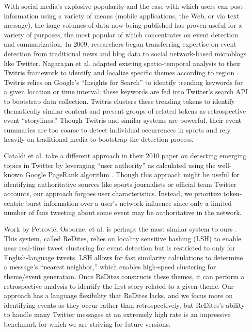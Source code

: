 \documentclass{acm_proc_article-sp}
\begin{document}
{\color{red}
With social media's explosive popularity and the ease with which users can post information using a variety of means (mobile applications, the Web, or via text message), the huge volumes of data now being published has proven useful for a variety of purposes, the most popular of which concentrates on event detection and summarization.
In 2009, researchers began transferring expertise on event detection from traditional news and blog data to social network-based microblogs like Twitter.
Nagarajan et al. adapted existing spatio-temporal analysis to their Twitris framework to identify and localize specific themes according to region \cite{Nagarajan:2009:SAC:1692411.1692481}.
Twitris relies on Google's ``Insights for Search'' to identify trending keywords for a given location or time interval; these keywords are fed into Twitter's search API to bootstrap data collection.
Twitris clusters these trending tokens to identify thematically similar content and present groups of related tokens as retrospective event ``storylines.''
Though Twitris and similar systems \cite{Sankaranarayanan:2009:TNT:1653771.1653781,Long:2011:TEE:2035562.2035636} are powerful, their event summaries are too coarse to detect individual occurrences in sports and rely heavily on traditional media to bootstrap the detection process.

Cataldi et al. take a different approach in their 2010 paper on detecting emerging topics in Twitter by leveraging ``user authority'' as calculated using the well-known Google PageRank algorithm \cite{Cataldi:2010:ETD:1814245.1814249}.
Though this approach might be useful for identifying authoritative sources like sports journalists or official team Twitter accounts, our approach forgoes user characteristics.
Instead, we prioritize token-centric burst information over  a user's network influence since only a limited number of fans tweeting about some event may be authoritative in the network.

Work by Petrovi\'{c}, Osborne, et al. is perhaps the most similar system to ours \cite{Petrovic:2010:SFS:1857999.1858020,petrovic2013can,osborne2014real}.
This system, called ReDites, relies on locality sensitive hashing (LSH) to enable near real-time tweet clustering for event detection but is restricted to only for English-language tweets.
LSH allows for fast similarity calculations to determine a message's ``nearest neighbor,'' which enables high-speed clustering for theme/event generation.
Once ReDites constructs these themes, it can perform a retrospective analysis to identify the first story related to a given theme.
Our approach has a language flexibility that ReDites lacks, and we focus more on identifying events as they occur rather than retrospectively, but ReDites's ability to handle many Twitter messages at an extremely high rate is an impressive benchmark for which we are striving for future versions.

}
\end{document}
